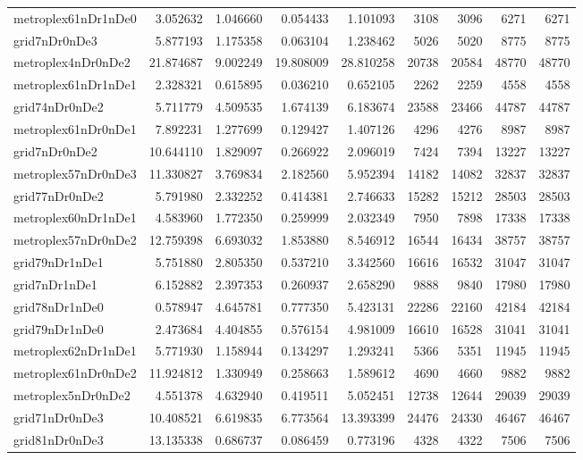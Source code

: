 \begin{longtable}{|l|r|r|r|r|r|r|r|r|}
metroplex61nDr1nDe0 & 3.052632 & 1.046660 & 0.054433 & 1.101093 & 3108 & 3096 & 6271 & 6271 \\
grid7nDr0nDe3 & 5.877193 & 1.175358 & 0.063104 & 1.238462 & 5026 & 5020 & 8775 & 8775 \\
metroplex4nDr0nDe2 & 21.874687 & 9.002249 & 19.808009 & 28.810258 & 20738 & 20584 & 48770 & 48770 \\
metroplex61nDr1nDe1 & 2.328321 & 0.615895 & 0.036210 & 0.652105 & 2262 & 2259 & 4558 & 4558 \\
grid74nDr0nDe2 & 5.711779 & 4.509535 & 1.674139 & 6.183674 & 23588 & 23466 & 44787 & 44787 \\
metroplex61nDr0nDe1 & 7.892231 & 1.277699 & 0.129427 & 1.407126 & 4296 & 4276 & 8987 & 8987 \\
grid7nDr0nDe2 & 10.644110 & 1.829097 & 0.266922 & 2.096019 & 7424 & 7394 & 13227 & 13227 \\
metroplex57nDr0nDe3 & 11.330827 & 3.769834 & 2.182560 & 5.952394 & 14182 & 14082 & 32837 & 32837 \\
grid77nDr0nDe2 & 5.791980 & 2.332252 & 0.414381 & 2.746633 & 15282 & 15212 & 28503 & 28503 \\
metroplex60nDr1nDe1 & 4.583960 & 1.772350 & 0.259999 & 2.032349 & 7950 & 7898 & 17338 & 17338 \\
metroplex57nDr0nDe2 & 12.759398 & 6.693032 & 1.853880 & 8.546912 & 16544 & 16434 & 38757 & 38757 \\
grid79nDr1nDe1 & 5.751880 & 2.805350 & 0.537210 & 3.342560 & 16616 & 16532 & 31047 & 31047 \\
grid7nDr1nDe1 & 6.152882 & 2.397353 & 0.260937 & 2.658290 & 9888 & 9840 & 17980 & 17980 \\
grid78nDr1nDe0 & 0.578947 & 4.645781 & 0.777350 & 5.423131 & 22286 & 22160 & 42184 & 42184 \\
grid79nDr1nDe0 & 2.473684 & 4.404855 & 0.576154 & 4.981009 & 16610 & 16528 & 31041 & 31041 \\
metroplex62nDr1nDe1 & 5.771930 & 1.158944 & 0.134297 & 1.293241 & 5366 & 5351 & 11945 & 11945 \\
metroplex61nDr0nDe2 & 11.924812 & 1.330949 & 0.258663 & 1.589612 & 4690 & 4660 & 9882 & 9882 \\
metroplex5nDr0nDe2 & 4.551378 & 4.632940 & 0.419511 & 5.052451 & 12738 & 12644 & 29039 & 29039 \\
grid71nDr0nDe3 & 10.408521 & 6.619835 & 6.773564 & 13.393399 & 24476 & 24330 & 46467 & 46467 \\
grid81nDr0nDe3 & 13.135338 & 0.686737 & 0.086459 & 0.773196 & 4328 & 4322 & 7506 & 7506 \\

\end{longtable}
